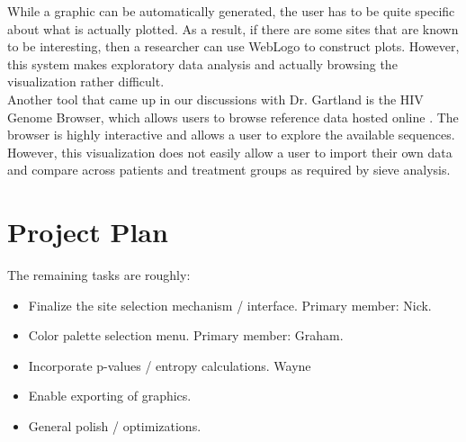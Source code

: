\documentclass{article}
\begin{document}
While a graphic can be automatically generated, the user has to be quite specific about what is actually plotted.  As a result, if there are some sites that are known to be interesting, then a researcher can use WebLogo to construct plots.  However, this system makes exploratory data analysis and actually browsing the visualization rather difficult.
\\
\newline
\noindent Another tool that came up in our discussions with Dr. Gartland is the HIV Genome Browser, which allows users to browse reference data hosted online \cite{hivgenomebrowser}.   The browser is highly interactive and allows a user to explore the available sequences.   However, this visualization does not easily allow a user to import their own data and compare across patients and treatment groups as required by sieve analysis.  


\section{Project Plan}

The remaining tasks are roughly:
\begin{itemize}
\item Finalize the site selection mechanism / interface.  Primary member: Nick.
\item Color palette selection menu.  Primary member: Graham.
\item Incorporate p-values / entropy calculations. Wayne
\item Enable exporting of graphics. 
\item General polish / optimizations. 
\end{itemize}



\end{document}
